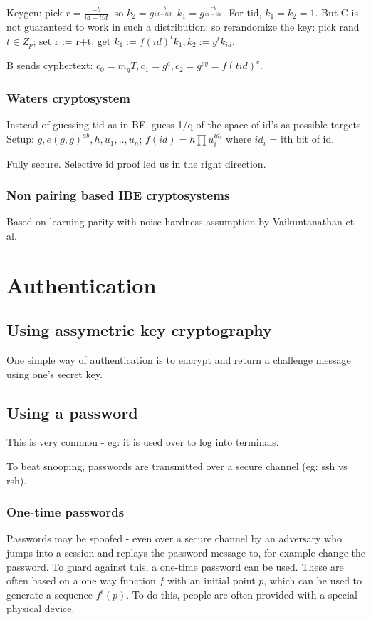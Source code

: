 \documentclass[oneside, article]{memoir}
\begin{document}
Keygen: pick $r = \frac{-b}{id-tid}$, so $k_{2} = g^{\frac{-b}{id-tid}}, k_{1} = g^{\frac{-y}{id-tid}}$. For tid, $k_{1} = k_{2} = 1$. But C is not guaranteed to work in such a distribution: so rerandomize the key: pick rand $t \in Z_{p}$; set r := r+t; get $k_{1} := f(id)^{t}k_{1}, k_{2} := g^{t}k_{id}$. \chk

B sends cyphertext: $c_{0} = m_{g}T, c_{1}=g^{c}, c_{2} = g^{cy} = f(tid)^{c}$.

\subsection{Waters cryptosystem}
Instead of guessing tid as in BF, guess 1/q of the space of id's as possible targets. Setup: $g, e(g,g)^{ab}, h, u_{1}, .. , u_{n}$; $f(id) = h \prod u_{i}^{id_{i}}$ where $id_{i}$ = ith bit of id.

Fully secure. Selective id proof led us in the right direction.

\subsection{Non pairing based IBE cryptosystems}
Based on learning parity with noise hardness assumption by Vaikuntanathan et al.

\chapter{Authentication}
\section{Using assymetric key cryptography}
One simple way of authentication is to encrypt and return a challenge message using one's secret key.

\section{Using a password}
This is very common - eg: it is used over to log into terminals.

To beat snooping, passwords are transmitted over a secure channel (eg: ssh vs rsh).

\subsection{One-time passwords}
Passwords may be spoofed - even over a secure channel by an adversary who jumps into a session and replays the password message to, for example change the password. To guard against this, a one-time password can be used. These are often based on a one way function $f$ with an initial point $p$, which can be used to  generate a sequence $f^i(p)$. To do this, people are often provided with a special physical device.
\end{document}
